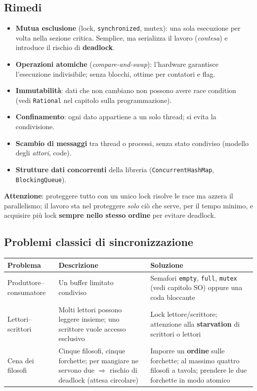 \subsection{Rimedi}
\begin{itemize}
    \item \textbf{Mutua esclusione} (lock, \texttt{synchronized}, mutex): una sola esecuzione per volta nella sezione critica. Semplice, ma serializza il lavoro (\emph{contesa}) e introduce il rischio di \textbf{deadlock}.
    \item \textbf{Operazioni atomiche} (\emph{compare-and-swap}): l'hardware garantisce l'esecuzione indivisibile; senza blocchi, ottime per contatori e flag.
    \item \textbf{Immutabilità}: dati che non cambiano non possono avere race condition (vedi \texttt{Rational} nel capitolo sulla programmazione).
    \item \textbf{Confinamento}: ogni dato appartiene a un solo thread; si evita la condivisione.
    \item \textbf{Scambio di messaggi} tra thread o processi, senza stato condiviso (modello degli \emph{attori}, code).
    \item \textbf{Strutture dati concorrenti} della libreria (\texttt{ConcurrentHashMap}, \texttt{BlockingQueue}).
\end{itemize}
\textbf{Attenzione}: proteggere tutto con un unico lock risolve le race ma azzera il parallelismo; il lavoro sta nel proteggere \emph{solo} ciò che serve, per il tempo minimo, e acquisire più lock \textbf{sempre nello stesso ordine} per evitare deadlock.

\subsection{Problemi classici di sincronizzazione}
\begin{center}
\small
\begin{tabularx}{\textwidth}{@{}>{\raggedright\arraybackslash}p{3.1cm}XX@{}}
\toprule
\textbf{Problema} & \textbf{Descrizione} & \textbf{Soluzione} \\
\midrule
Produttore--consumatore & Un buffer limitato condiviso & Semafori \texttt{empty}, \texttt{full}, \texttt{mutex} (vedi capitolo SO) oppure una coda bloccante \\
Lettori--scrittori & Molti lettori possono leggere insieme; uno scrittore vuole accesso esclusivo & Lock lettore/scrittore; attenzione alla \textbf{starvation} di scrittori o lettori \\
Cena dei filosofi & Cinque filosofi, cinque forchette; per mangiare ne servono due $\Rightarrow$ rischio di deadlock (attesa circolare) & Imporre un \textbf{ordine} sulle forchette; al massimo quattro filosofi a tavola; prendere le due forchette in modo atomico \\
\bottomrule
\end{tabularx}
\end{center}

